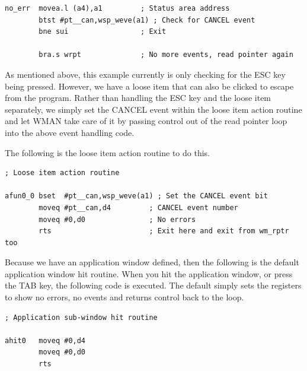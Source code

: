 \begin{lstlisting}[firstnumber=last,caption={ApplTest\_asm - Event Handling}]
no_err  movea.l (a4),a1         ; Status area address
        btst #pt__can,wsp_weve(a1) ; Check for CANCEL event
        bne sui                 ; Exit

        bra.s wrpt              ; No more events, read pointer again
\end{lstlisting}

As mentioned above, this example currently is only checking for the
    ESC key being pressed. However, we have a loose item that can also be
    clicked to escape from the program. Rather than handling the ESC key and
    the loose item separately, we simply set the CANCEL event within the loose
    item action routine and let WMAN take care of
    it by passing control out of the read pointer loop into the above event
    handling code.

The following is the loose item action routine to do this.

\begin{lstlisting}[firstnumber=last,caption={ApplTest\_asm - ESC Loose Item Action Routine}]
; Loose item action routine

afun0_0 bset  #pt__can,wsp_weve(a1) ; Set the CANCEL event bit
        moveq #pt__can,d4         ; CANCEL event number
        moveq #0,d0               ; No errors
        rts                       ; Exit here and exit from wm_rptr too
\end{lstlisting}

Because we have an application window defined, then the following is
    the default application window hit routine. When you hit the application
    window, or press the TAB key, the following code is executed. The default
    simply sets the registers to show no errors, no events and returns control
    back to the  loop.

\begin{lstlisting}[firstnumber=last,caption={ApplTest\_asm - Application Window HIT Routine}]
; Application sub-window hit routine

ahit0   moveq #0,d4
        moveq #0,d0
        rts
\end{lstlisting}


